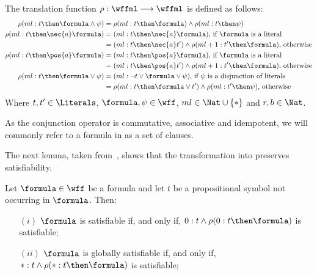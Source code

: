 \begin{definition}
    The translation function $\rho : \wffml \longrightarrow \wffml$ is defined
    as follows:
        \begin{align*}
            \rho(ml : t \then \formula \land \psi) & = \rho(ml : t \then \formula) \land \rho(ml : t \then \psi) \\
            \rho(ml : t \then \nec{a} \formula) & = (ml : t \then \nec{a} \formula) \text{, if \formula\ is a literal}\\
                                                & = (ml : t \then \nec{a} t') \land \rho(ml+1 : t' \then \formula) \text{, otherwise}\\
            \rho(ml : t \then \pos{a} \formula) & = (ml : t \then \pos{a} \formula) \text{, if \formula\ is a literal}\\
                                                & = (ml : t \then \pos{a} t') \land \rho(ml+1 : t' \then \formula) \text{, otherwise}\\
            \rho(ml : t \then \formula \lor \psi) & = (ml : \neg t \lor \formula
            \lor \psi) \text{, if $\psi$ is a disjunction of literals}\\
                                                  & = \rho(ml : t \then \formula \lor t') \land \rho(ml : t' \then \psi) \text{, otherwise}
        \end{align*}
        Where $t, t' \in \Literals$, $\formula, \psi \in \wff$, $ml \in
        \Nat \cup \{*\}$ and $r, b \in \Nat$.
\end{definition}

As the conjunction operator is commutative, associative and idempotent, we will
commonly refer to a formula in  as a set of clauses.

The next lemma, taken from~\cite{nalon2015modal}, shows that the transformation
into  preserves satisfiability.

\begin{lemma}
    Let $\formula \in \wff$ be a formula and let $t$ be a propositional symbol
    not occurring in $\formula$. Then: 
    \begin{enumerate}
        \item[$(i)$] $\formula$ is satisfiable if, and only if, $0 : t \land \rho(0 : t \then \formula)$ is satisfiable;
        \item[$(ii)$] $\formula$ is globally satisfiable if, and only if, $* : t \land \rho(* : t \then \formula)$ is satisfiable;
    \end{enumerate}
\end{lemma}

